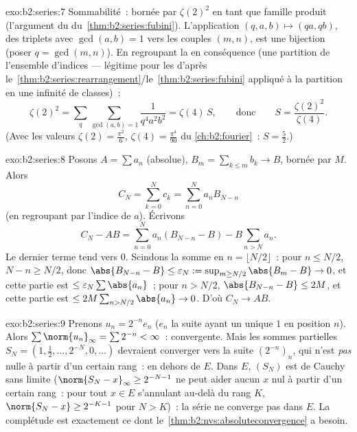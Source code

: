 \begin{solution}{exo:b2:series:7}
Sommabilité~: bornée par $\zeta(2)^2$ en tant que famille produit
(l'argument du  du~\cref{thm:b2:series:fubini}).
L'application $(q, a, b) \mapsto (qa, qb)$, des triplets avec
$\gcd(a, b) = 1$ vers les couples $(m, n)$, est une bijection (poser
$q = \gcd(m,n)$). En regroupant la  en conséquence
(une partition de l'ensemble d'indices --- légitime pour les  d'après le~\cref{thm:b2:series:rearrangement}/le~\cref{thm:b2:series:fubini}
appliqué à la partition en une infinité  de classes)~:
\[
\zeta(2)^2 = \sum_{q} \sum_{\gcd(a,b)=1} \frac{1}{q^4 a^2 b^2}
= \zeta(4)\, S,
\qquad\text{donc}\qquad
S = \frac{\zeta(2)^2}{\zeta(4)} .
\]
(Avec les valeurs $\zeta(2) = \frac{\pi^2}{6}$,
$\zeta(4) = \frac{\pi^4}{90}$ du \cref{ch:b2:fourier}~: $S =
\frac{5}{2}$.)
\end{solution}

\begin{solution}{exo:b2:series:8}
Posons $A = \sum a_n$ (absolue), $B_m = \sum_{k\leq m} b_k \to B$,
bornée par $M$. Alors
\[
C_N = \sum_{k=0}^{N} c_k = \sum_{n=0}^{N} a_n B_{N-n}
\]
(en regroupant par l'indice de $a$). Écrivons
\[
C_N - AB = \sum_{n=0}^{N} a_n (B_{N-n} - B) - B\sum_{n > N} a_n .
\]
Le dernier terme tend vers $0$. Scindons la somme en $n = \lfloor N/2
\rfloor$~: pour $n \leq N/2$, $N - n \geq N/2$, donc $\abs{B_{N-n} - B}
\leq \varepsilon_N := \sup_{m \geq N/2}\abs{B_m - B} \to 0$, et
cette partie est $\leq \varepsilon_N \sum\abs{a_n}$~; pour $n > N/2$,
$\abs{B_{N-n} - B} \leq 2M$, et cette partie est $\leq 2M \sum_{n >
N/2} \abs{a_n} \to 0$. D'où $C_N \to AB$.
\end{solution}

\begin{solution}{exo:b2:series:9}
Prenons $u_n = 2^{-n} e_n$ ($e_n$ la suite ayant un unique $1$ en
position $n$). Alors $\sum \norm{u_n}_\infty = \sum 2^{-n} <
\infty$~:  convergente. Mais les sommes partielles $S_N =
(1, \tfrac12, \dots, 2^{-N}, 0, \dots)$ devraient converger vers la
suite $(2^{-n})_n$, qui n'est \emph{pas} nulle à partir d'un certain
rang~: en dehors de $E$. Dans $E$, $(S_N)$ est de Cauchy sans limite
($\norm{S_N - x}_\infty \geq 2^{-N-1}$ ne peut aider aucun $x$ nul à
partir d'un certain rang~: pour tout $x \in E$ s'annulant au-delà du
rang $K$, $\norm{S_N - x} \geq 2^{-K-1}$ pour $N > K$)~: la série ne
converge pas dans $E$. La complétude est exactement ce dont
le~\cref{thm:b2:nvs:absoluteconvergence} a besoin.
\end{solution}


